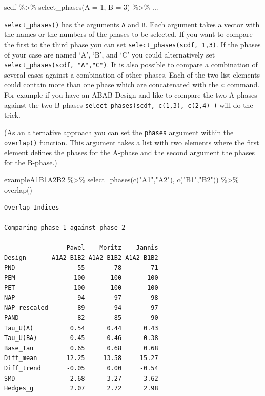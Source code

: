 \documentclass[
  letterpaper,
  DIV=11,
  numbers=noendperiod]{scrreprt}
\newenvironment{Shaded}{\begin{snugshade}}{\end{snugshade}}
\newcommand{\AttributeTok}[1]{\textcolor[rgb]{0.40,0.45,0.13}{#1}}
\newcommand{\DecValTok}[1]{\textcolor[rgb]{0.68,0.00,0.00}{#1}}
\newcommand{\FunctionTok}[1]{\textcolor[rgb]{0.28,0.35,0.67}{#1}}
\newcommand{\NormalTok}[1]{\textcolor[rgb]{0.00,0.23,0.31}{#1}}
\newcommand{\SpecialCharTok}[1]{\textcolor[rgb]{0.37,0.37,0.37}{#1}}
\newcommand{\StringTok}[1]{\textcolor[rgb]{0.13,0.47,0.30}{#1}}
\begin{document}
\begin{Shaded}
\begin{Highlighting}[]
\NormalTok{scdf }\SpecialCharTok{\%\textgreater{}\%} \FunctionTok{select\_phases}\NormalTok{(}\AttributeTok{A =} \DecValTok{1}\NormalTok{, }\AttributeTok{B =} \DecValTok{3}\NormalTok{) }\SpecialCharTok{\%\textgreater{}\%}\NormalTok{ ...}
\end{Highlighting}
\end{Shaded}

\texttt{select\_phases()} has the arguments \texttt{A} and \texttt{B}.
Each argument takes a vector with the names or the numbers of the phases
to be selected. If you want to compare the first to the third phase you
can set \texttt{select\_phases(scdf,\ 1,3)}. If the phases of your case
are named `A', `B', and `C' you could alternatively set
\texttt{select\_phases(scdf,\ "A","C")}. It is also possible to compare
a combination of several cases against a combination of other phases.
Each of the two list-elements could contain more than one phase which
are concatenated with the \texttt{c} command. For example if you have an
ABAB-Design and like to compare the two A-phases against the two
B-phases \texttt{select\_phases(scdf,\ c(1,3),\ c(2,4)\ )} will do the
trick.

(As an alternative approach you can set the \texttt{phases} argument
within the \texttt{overlap()} function. This argument takes a list with
two elements where the first element defines the phases for the A-phase
and the second argument the phases for the B-phase.)

\begin{Shaded}
\begin{Highlighting}[]
\NormalTok{exampleA1B1A2B2 }\SpecialCharTok{\%\textgreater{}\%}
  \FunctionTok{select\_phases}\NormalTok{(}\FunctionTok{c}\NormalTok{(}\StringTok{"A1"}\NormalTok{,}\StringTok{"A2"}\NormalTok{), }\FunctionTok{c}\NormalTok{(}\StringTok{"B1"}\NormalTok{,}\StringTok{"B2"}\NormalTok{)) }\SpecialCharTok{\%\textgreater{}\%}
  \FunctionTok{overlap}\NormalTok{()}
\end{Highlighting}
\end{Shaded}

\begin{verbatim}
Overlap Indices

Comparing phase 1 against phase 2 

                 Pawel    Moritz    Jannis
Design       A1A2-B1B2 A1A2-B1B2 A1A2-B1B2
PND                 55        78        71
PEM                100       100       100
PET                100       100       100
NAP                 94        97        98
NAP rescaled        89        94        97
PAND                82        85        90
Tau_U(A)          0.54      0.44      0.43
Tau_U(BA)         0.45      0.46      0.38
Base_Tau          0.65      0.68      0.68
Diff_mean        12.25     13.58     15.27
Diff_trend       -0.05      0.00     -0.54
SMD               2.68      3.27      3.62
Hedges_g          2.07      2.72      2.98
\end{verbatim}
\end{document}

